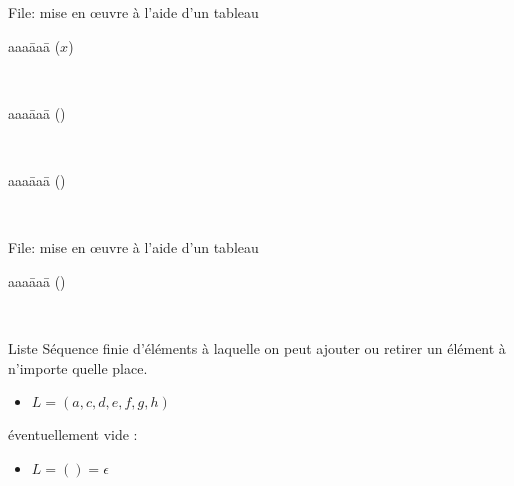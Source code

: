 \begin{frame}{File: mise en {\oe}uvre à l’aide d'un tableau}

\begin{tabbing}
  aaa\=aaa\=\kill
  ($x$) \\
  \end{tabbing}

~\\

\begin{tabbing}
  aaa\=aaa\=\kill
  () \\
\end{tabbing}

~\\
\begin{tabbing}
  aaa\=aaa\=\kill
  () \\
\end{tabbing}
~\\
\end{frame}

\begin{frame}{File: mise en {\oe}uvre à l’aide d'un tableau}

\begin{tabbing}
  aaa\=aaa\=\kill
  () \\
\end{tabbing}
~\\
\end{frame}


\begin{frame}{Liste}
Séquence finie d'éléments à laquelle on peut ajouter ou retirer  un  élément à  n'importe quelle place.
 
  \begin{itemize}
  \item $L =  (a,c,d,e,f,g,h)$
  \end{itemize}
  éventuellement vide :
  \begin{itemize}
  \item $L = () = \epsilon$
  \end{itemize}
\end{frame}

